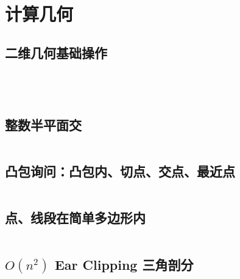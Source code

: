 			\section{计算几何}
				\subsection{二维几何基础操作}
					\inputminted{cpp}{src/Geometry/凸包.cpp}
					\inputminted{cpp}{src/Geometry/闵可夫斯基和.cpp}
					\inputminted{cpp}{src/Geometry/geo.cpp}
					\inputminted{cpp}{src/Geometry/半平面交.cpp}
				\subsection{整数半平面交}
					\inputminted{cpp}{src/Geometry/integral_hpi.cpp}
				\subsection{凸包询问：凸包内、切点、交点、最近点}
					\inputminted{cpp}{src/Geometry/convex_findmax.cpp}



				 \subsection{点、线段在简单多边形内}
					\inputminted{cpp}{src/Geometry/AirportConstruction.cpp}
				\subsection{$O(n ^ 2)$ Ear Clipping 三角剖分}
				\inputminted{cpp}{src/Geometry/Triangulation.cpp}
